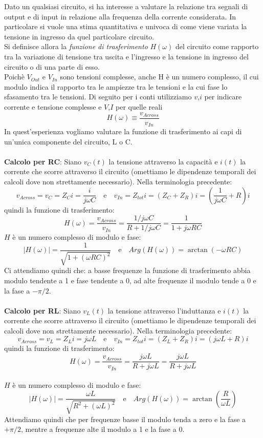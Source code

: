 Dato un qualsiasi circuito, si ha interesse a valutare la relazione tra segnali di output e di input in relazione alla frequenza della corrente considerata. In particolare si vuole una stima quantitativa e univoca di come viene variata la tensione in ingresso da quel particolare circuito.\\
Si definisce allora la \textit{funzione di trasferimento} $H(\omega)$ del circuito come rapporto tra la variazione di tensione tra uscita e l'ingresso e la tensione in ingresso del circuito o di una parte di esso.\\ 
Poichè $V_{Out}$ e $V_{In}$ sono tensioni complesse, anche H è un numero complesso, il cui modulo indica il rapporto tra le ampiezze tra le tensioni e la cui fase lo sfasamento tra le tensioni.
Di seguito per i conti utilizziamo $v$,$i$ per indicare corrente e tensione complesse e $V$,$I$ per quelle reali
    $$ H(\omega) \equiv \frac{v_{Across}}{v_{In}}$$
In quest'esperienza vogliamo valutare la funzione di trasferimento ai capi di un'unica componente del circuito, L o C.\\\\
%
\textbf{Calcolo per RC}: 
Siano $v_{C}(t)$ la tensione attraverso la capacità e $i(t)$ la corrente che scorre attraverso il circuito (omettiamo le dipendenze temporali dei calcoli dove non strettamente necessario). Nella terminologia precedente:
    $$v_{Across}=v_C = Z_C i = \frac{i}{j\omega C} \quad\mathrm{e}\quad v_{In} = Z_{tot}i = (Z_C+Z_R)i = \left(\frac{1}{j\omega C} + R\right)i$$ 
quindi la funzione di trasferimento:
    $$H(\omega) = \frac{v_{Across} }{v_{In} } = \frac{1/j\omega C}{R+1/j\omega C} = \frac{1}{1+j\omega RC}$$
%
$H$ è un numero complesso di modulo e fase:
    $$|H(\omega)| = \frac{1}{\sqrt{1+(\omega RC)^2} } \quad\mathrm{e}\quad Arg(H(\omega)) = \arctan (-\omega RC)$$
Ci attendiamo quindi che: a basse frequenze la funzione di trasferimento abbia modulo tendente a 1 e fase tendente a 0, ad alte frequenze il modulo tende a 0 e la fase a $-\pi/2$.\\\\
%
\textbf{Calcolo per RL}: Siano $v_{L}(t)$ la tensione attraverso l'induttanza e $i(t)$ la corrente che scorre attraverso il circuito (omettiamo le dipendenze temporali dei calcoli dove non strettamente necessario). Nella terminologia precedente:
    $$v_{Across}=v_L = Z_L i = j\omega L \quad\mathrm{e}\quad v_{In} = Z_{tot}i = (Z_L+Z_R)i = (j\omega L + R )i$$ 
quindi la funzione di trasferimento:
    $$H(\omega) = \frac{v_{Across} }{v_{In} } = \frac{j\omega L}{R+j\omega L} = \frac{j\omega L}{R+j\omega L}$$\\
$H$ è un numero complesso di modulo e fase:
    $$|H(\omega)| = \frac{\omega L}{\sqrt{R^2+(\omega L)^2} } \quad\mathrm{e}\quad Arg(H(\omega)) = \arctan \left(\frac{R}{\omega L}\right)$$
Attendiamo quindi che per frequenze basse il modulo tenda a zero e la fase a $+\pi/2$, mentre a frequenze alte il modulo a 1 e la fase a 0.
%
